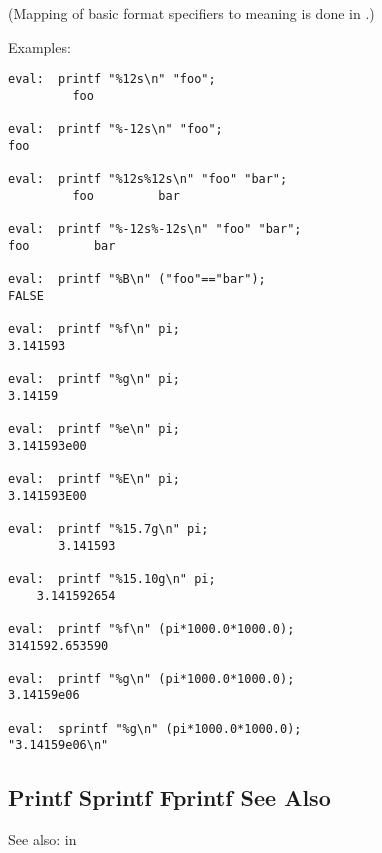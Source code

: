(Mapping of basic format specifiers to meaning is done in 
.)

Examples:
\begin{verbatim}
eval:  printf "%12s\n" "foo";
         foo

eval:  printf "%-12s\n" "foo";
foo         

eval:  printf "%12s%12s\n" "foo" "bar";
         foo         bar

eval:  printf "%-12s%-12s\n" "foo" "bar";
foo         bar         

eval:  printf "%B\n" ("foo"=="bar");
FALSE

eval:  printf "%f\n" pi;
3.141593

eval:  printf "%g\n" pi;
3.14159

eval:  printf "%e\n" pi;
3.141593e00

eval:  printf "%E\n" pi;
3.141593E00

eval:  printf "%15.7g\n" pi;
       3.141593

eval:  printf "%15.10g\n" pi;
    3.141592654

eval:  printf "%f\n" (pi*1000.0*1000.0);
3141592.653590

eval:  printf "%g\n" (pi*1000.0*1000.0);
3.14159e06

eval:  sprintf "%g\n" (pi*1000.0*1000.0);
"3.14159e06\n"
\end{verbatim}

\cutend*

\subsection{Printf Sprintf Fprintf  See Also}
\label{section:libref:printf-sprintf-fprintf:see-also}

See also:   in \newline 

\cutend*

